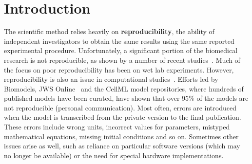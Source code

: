 \documentclass[10pt,letterpaper]{article}
\begin{document}
\linenumbers

\section*{Introduction}



\medskip

The scientific method relies heavily on {\bf reproducibility}, the ability of independent investigators to obtain the same results using the same reported experimental procedure.  Unfortunately, a significant portion of the biomedical research is not reproducible, as shown by a number of recent studies~\cite{prinz2011believe,mobley2013survey}.
Much of the focus on poor reproducibility has been on wet lab experiments. However, reproducibility is also an issue in computational studies~\cite{peng2016moving,medley2016guidelines,mcdougal2016reproducibility,waltemath2016modeling}.  Efforts led by Biomodels, JWS Online~\cite{olivier2004web} and the CellML model repositories, where hundreds of published models have been curated, have shown that over 95\% of the models are not reproducible (personal communication). Most often, errors are introduced when the model is transcribed from the private version to the final publication.  These errors include wrong units, incorrect values for parameters, mistyped mathematical equations, missing initial conditions and so on. Sometimes other issues arise as well, such as reliance on particular software versions (which may no longer be available) or the need for special hardware implementations.
\end{document}
